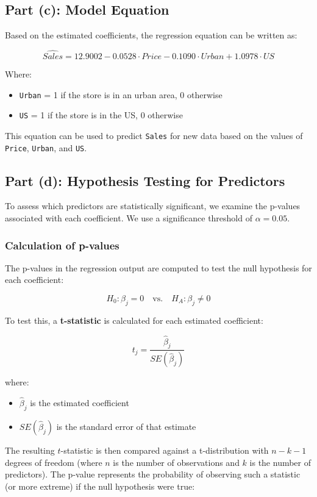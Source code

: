 \documentclass[12pt]{article}
\begin{document}
\subsection*{Part (c): Model Equation}

Based on the estimated coefficients, the regression equation can be written as:

\[
\hat{Sales} = 12.9002 - 0.0528 \cdot Price - 0.1090 \cdot Urban + 1.0978 \cdot US
\]

Where:
\begin{itemize}
  \item \texttt{Urban} = 1 if the store is in an urban area, 0 otherwise
  \item \texttt{US} = 1 if the store is in the US, 0 otherwise
\end{itemize}

\noindent
This equation can be used to predict \texttt{Sales} for new data based on the values of \texttt{Price}, \texttt{Urban}, and \texttt{US}.

\subsection*{Part (d): Hypothesis Testing for Predictors}

To assess which predictors are statistically significant, we examine the p-values associated with each coefficient. We use a significance threshold of $\alpha = 0.05$.

\subsubsection*{Calculation of p-values}

The p-values in the regression output are computed to test the null hypothesis for each coefficient:

\[
H_0: \beta_j = 0 \quad \text{vs.} \quad H_A: \beta_j \neq 0
\]

To test this, a \textbf{t-statistic} is calculated for each estimated coefficient:

\[
t_j = \frac{\hat{\beta}_j}{SE(\hat{\beta}_j)}
\]

where:
\begin{itemize}
  \item \( \hat{\beta}_j \) is the estimated coefficient
  \item \( SE(\hat{\beta}_j) \) is the standard error of that estimate
\end{itemize}

The resulting \( t \)-statistic is then compared against a t-distribution with \( n - k - 1 \) degrees of freedom (where \( n \) is the number of observations and \( k \) is the number of predictors). The p-value represents the probability of observing such a statistic (or more extreme) if the null hypothesis were true:
\end{document}
